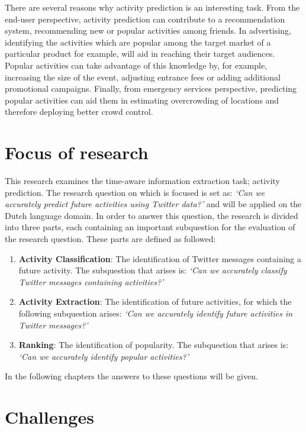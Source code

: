 There are several reasons why activity prediction is an interesting task. From the end-user perspective, activity prediction can contribute to a recommendation system, recommending new or popular activities among friends. In advertising, identifying the activities which are popular among the target market of a particular product for example, will aid in reaching their target audiences. Popular activities can take advantage of this knowledge by, for example, increasing the size of the event, adjusting entrance fees or adding additional promotional campaigns. Finally, from emergency services perspective, predicting popular activities can aid them in estimating overcrowding of locations and therefore deploying better crowd control.

\section{Focus of research}
This research examines the time-aware information extraction task; activity prediction. The research question on which is focused is set as: \textit{`Can we accurately predict future activities using Twitter data?'} and will be applied on the Dutch language domain. In order to answer this question, the research is divided into three parts, each containing an important subquestion for the evaluation of the research question. These parts are defined as followed: 
\begin{enumerate}
\item \textbf{Activity Classification}: The identification of Twitter messages containing a future activity. The subquestion that arises is: \textit{`Can we accurately classify Twitter messages containing activities?'}
\item \textbf{Activity Extraction}: The identification of future activities, for which the following subquestion arises: \textit{`Can we accurately identify future activities in Twitter messages?'}
\item \textbf{Ranking}: The identification of popularity. The subquestion that arises is: \textit{`Can we accurately identify popular activities?'}
\end{enumerate}
In the following chapters the answers to these questions will be given.

\section{Challenges}\label{challenges}


